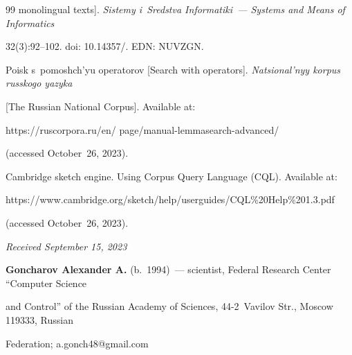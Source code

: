 {{\begin{thebibliography}{99}
monolingual texts]. \textit{Sistemy i~Sredstva Informatiki~--- Systems and Means of Informatics} 


32(3):92--102. doi: 10.14357\!/. EDN: \mbox{NUVZGN}.




Poisk s~po\-moshch'yu ope\-ra\-to\-rov [Search with operators]. \textit{Na\-tsi\-o\-nal'\-nyy kor\-pus rus\-sko\-go yazy\-ka} 


[The Russian National Corpus]. Available at: {\sf  


https://ruscorpora.ru/en/ page/manual-lemmasearch-advanced/} (accessed October~26, 2023).




Cambridge sketch engine. Using Corpus Query Language (CQL). Available at: {\sf 


https://www.cambridge.org/sketch/help/userguides/CQL\%20Help\%201.3.pdf} (accessed October~26, 2023).








\end{thebibliography}


} }





\vspace*{-7pt}





\hfill{\small\textit{Received September 15, 2023}} 





\vspace*{-15pt} 





\Contrl





\vspace*{-5pt}





\noindent


\textbf{Goncharov Alexander A.} (b.\ 1994)~--- scientist, Federal Research Center ``Computer Science 


and Control'' of the Russian Academy of Sciences, 44-2~Vavilov Str., Moscow 119333, Russian 


Federation; \mbox{a.gonch48@gmail.com}





\label{end\stat}





\renewcommand{\bibname}{\protect\rm Литература} 


